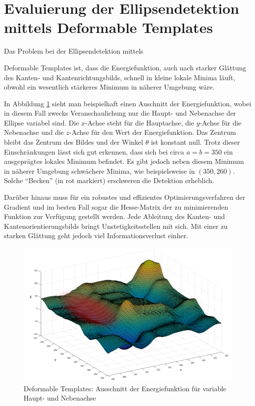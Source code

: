 \section{Evaluierung der Ellipsendetektion mittels Deformable Templates}
Das Problem bei der Ellipsendetektion mittels {Deformable Templates ist, dass die Energiefunktion, auch nach starker Glättung des Kanten- und Kantenrichtungsbilds, schnell in kleine lokale Minima läuft, obwohl ein wesentlich stärkeres Minimum in näherer Umgebung wäre.

In Abbildung \ref{fig:deformable} sieht man beispielhaft einen Auschnitt der Energiefunktion, wobei in diesem Fall zwecks Veranschaulichung nur die Haupt- und Nebenachse der Ellipse variabel sind. 
Die $x$-Achse steht für die Hauptachse, die $y$-Achse für die Nebenachse und die $z$-Achse für den Wert der Energiefunktion.
Das Zentrum bleibt das Zentrum des Bildes und der Winkel $\theta$ ist konstant null. Trotz dieser Einschränkungen lässt sich gut erkennen, dass sich bei circa $a = b = 350$ ein ausgeprägtes lokales Minimum befindet. Es gibt jedoch neben diesem Minimum in näherer Umgebung schwächere Minima, wie beispielsweise in $(350, 260)$. Solche "`Becken"' (in rot markiert) erschweren die Detektion erheblich.

Darüber hinaus muss für ein robustes und effizientes Optimierungsverfahren der Gradient und im besten Fall sogar die Hesse-Matrix der zu minimierenden Funktion zur Verfügung gestellt werden.  Jede Ableitung des Kanten- und Kantenorientierungsbilds bringt Unstetigkeitsstellen mit sich. Mit einer zu starken Glättung geht jedoch viel Informationsverlust einher.


\begin{figure}[!htb]
	\centering
	\includegraphics[scale=.4]{images/deformableHighlighted.png}
	\caption{Deformable Templates: Ausschnitt der Energiefunktion für variable Haupt- und Nebenachse}
	\label{fig:deformable}
\end{figure}


}
